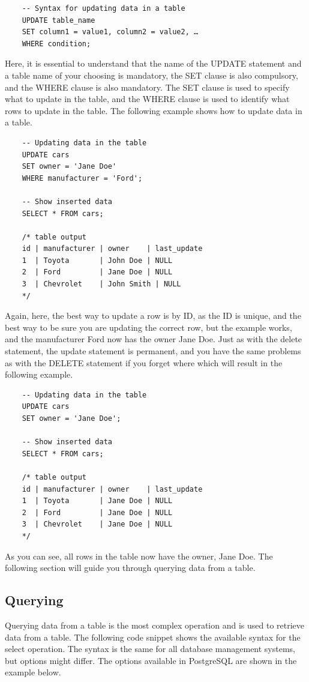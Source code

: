\begin{verbatim}
    -- Syntax for updating data in a table
    UPDATE table_name
    SET column1 = value1, column2 = value2, …
    WHERE condition;
\end{verbatim}

Here, it is essential to understand that the name of the UPDATE statement and a table name of your choosing is mandatory, the SET clause is also compulsory, and the WHERE clause is also mandatory. The SET clause is used to specify what to update in the table, and the WHERE clause is used to identify what rows to update in the table. The following example shows how to update data in a table.

\begin{verbatim}
    -- Updating data in the table
    UPDATE cars
    SET owner = 'Jane Doe'
    WHERE manufacturer = 'Ford';

    -- Show inserted data
    SELECT * FROM cars;

    /* table output
    id | manufacturer | owner    | last_update
    1  | Toyota       | John Doe | NULL
    2  | Ford         | Jane Doe | NULL
    3  | Chevrolet    | John Smith | NULL
    */
\end{verbatim}

Again, here, the best way to update a row is by ID, as the ID is unique, and the best way to be sure you are updating the correct row, but the example works, and the manufacturer Ford now has the owner Jane Doe. Just as with the delete statement, the update statement is permanent, and you have the same problems as with the DELETE statement if you forget where which will result in the following example.

\begin{verbatim}
    -- Updating data in the table
    UPDATE cars
    SET owner = 'Jane Doe';

    -- Show inserted data
    SELECT * FROM cars;

    /* table output
    id | manufacturer | owner    | last_update
    1  | Toyota       | Jane Doe | NULL
    2  | Ford         | Jane Doe | NULL
    3  | Chevrolet    | Jane Doe | NULL
    */
\end{verbatim}

As you can see, all rows in the table now have the owner, Jane Doe. The following section will guide you through querying data from a table.

\subsection{Querying}
Querying data from a table is the most complex operation and is used to retrieve data from a table. The following code snippet shows the available syntax for the select operation. The syntax is the same for all database management systems, but options might differ. The options available in PostgreSQL are shown in the example below.

